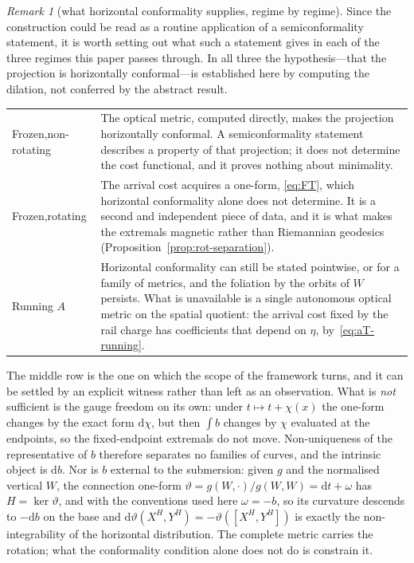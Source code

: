 \documentclass[12pt]{iopart}
\theoremstyle{plain}
\theoremstyle{definition}
\theoremstyle{remark}
\newtheorem{remark}[proposition]{Remark}
\newcommand{\dd}{\mathrm{d}}
\begin{document}
\begin{remark}[what horizontal conformality supplies, regime by regime]
\label{rmk:hc-scope}
Since the construction could be read as a routine application of a
semiconformality statement, it is worth setting out what such a statement gives
in each of the three regimes this paper passes through. In all three the
hypothesis---that the projection is horizontally conformal---is established here
by computing the dilation, not conferred by the abstract result.
\begin{center}
\begin{tabular}{@{}p{}p{}@{}}
\hline
Frozen,\newline non-rotating & The optical metric, computed directly, makes the
projection horizontally conformal. A semiconformality statement describes a
property of that projection; it does not determine the cost functional, and it
proves nothing about minimality.\\[2pt]
Frozen,\newline rotating & The arrival cost acquires a one-form,
\eqref{eq:FT}, which horizontal conformality alone does not determine. It is a
second and independent piece of data, and it is what makes the extremals
magnetic rather than Riemannian geodesics
(Proposition~\ref{prop:rot-separation}).\\[2pt]
Running $A$ & Horizontal conformality can still be stated pointwise, or for a
family of metrics, and the foliation by the orbits of $W$ persists. What is
unavailable is a single autonomous optical metric on the spatial quotient: the arrival
cost fixed by the rail charge has coefficients that depend on $\eta$,
by~\eqref{eq:aT-running}.\\
\hline
\end{tabular}
\end{center}
The middle row is the one on which the scope of the framework turns, and it can
be settled by an explicit witness rather than left as an observation. What is
\emph{not} sufficient is the gauge freedom on its own: under $t\mapsto t+\chi(x)$
the one-form changes by the exact form $\dd\chi$, but then $\int b$ changes by
$\chi$ evaluated at the endpoints, so the fixed-endpoint extremals do not move.
Non-uniqueness of the representative of $b$ therefore separates no families of
curves, and the intrinsic object is $\dd b$. Nor is $b$ external to the
submersion: given $g$ and the normalised vertical $W$, the connection one-form
$\vartheta=g(W,\cdot)/g(W,W)=\dd t+\omega$ has $H=\ker\vartheta$, and with the
conventions used here $\omega=-b$, so its curvature descends to $-\dd b$ on the
base and $\dd\vartheta(X^H,Y^H)=-\vartheta([X^H,Y^H])$ is exactly the
non-integrability of the horizontal distribution. The complete metric carries
the rotation; what the conformality condition alone does not do is constrain it.


\end{remark}
\end{document}
